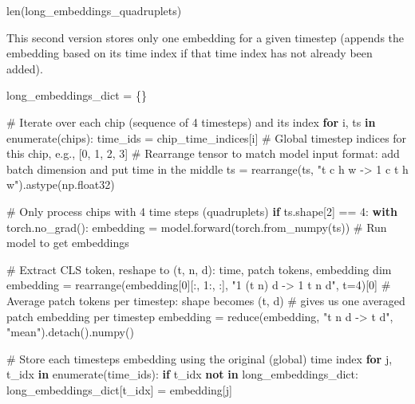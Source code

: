\documentclass[
  letterpaper,
  DIV=11,
  numbers=noendperiod]{scrreprt}
\newenvironment{Shaded}{\begin{snugshade}}{\end{snugshade}}
\newcommand{\BuiltInTok}[1]{\textcolor[rgb]{0.00,0.23,0.31}{#1}}
\newcommand{\CommentTok}[1]{\textcolor[rgb]{0.37,0.37,0.37}{#1}}
\newcommand{\ControlFlowTok}[1]{\textcolor[rgb]{0.00,0.23,0.31}{\textbf{#1}}}
\newcommand{\DecValTok}[1]{\textcolor[rgb]{0.68,0.00,0.00}{#1}}
\newcommand{\KeywordTok}[1]{\textcolor[rgb]{0.00,0.23,0.31}{\textbf{#1}}}
\newcommand{\NormalTok}[1]{\textcolor[rgb]{0.00,0.23,0.31}{#1}}
\newcommand{\OperatorTok}[1]{\textcolor[rgb]{0.37,0.37,0.37}{#1}}
\newcommand{\StringTok}[1]{\textcolor[rgb]{0.13,0.47,0.30}{#1}}
\begin{document}
\begin{Shaded}
\begin{Highlighting}[]
\BuiltInTok{len}\NormalTok{(long\_embeddings\_quadruplets)}
\end{Highlighting}
\end{Shaded}

This second version stores only one embedding for a given timestep
(appends the embedding based on its time index if that time index has
not already been added).

\begin{Shaded}
\begin{Highlighting}[]
\NormalTok{long\_embeddings\_dict }\OperatorTok{=}\NormalTok{ \{\}}

\CommentTok{\# Iterate over each chip (sequence of 4 timesteps) and its index}
\ControlFlowTok{for}\NormalTok{ i, ts }\KeywordTok{in} \BuiltInTok{enumerate}\NormalTok{(chips):}
\NormalTok{    time\_ids }\OperatorTok{=}\NormalTok{ chip\_time\_indices[i]  }\CommentTok{\# Global timestep indices for this chip, e.g., [0, 1, 2, 3]}
    \CommentTok{\# Rearrange tensor to match model input format: add batch dimension and put time in the middle}
\NormalTok{    ts }\OperatorTok{=}\NormalTok{ rearrange(ts, }\StringTok{"t c h w {-}\textgreater{} 1 c t h w"}\NormalTok{).astype(np.float32)}

    \CommentTok{\# Only process chips with 4 time steps (quadruplets)}
    \ControlFlowTok{if}\NormalTok{ ts.shape[}\DecValTok{2}\NormalTok{] }\OperatorTok{==} \DecValTok{4}\NormalTok{:}
        \ControlFlowTok{with}\NormalTok{ torch.no\_grad():}
\NormalTok{            embedding }\OperatorTok{=}\NormalTok{ model.forward(torch.from\_numpy(ts)) }\CommentTok{\# Run model to get embeddings}

        \CommentTok{\# Extract CLS token, reshape to (t, n, d): time, patch tokens, embedding dim}
\NormalTok{        embedding }\OperatorTok{=}\NormalTok{ rearrange(embedding[}\DecValTok{0}\NormalTok{][:, }\DecValTok{1}\NormalTok{:, :], }\StringTok{"1 (t n) d {-}\textgreater{} 1 t n d"}\NormalTok{, t}\OperatorTok{=}\DecValTok{4}\NormalTok{)[}\DecValTok{0}\NormalTok{]}
        \CommentTok{\# Average patch tokens per timestep: shape becomes (t, d)}
        \CommentTok{\# gives us one averaged patch embedding per timestep}
\NormalTok{        embedding }\OperatorTok{=} \BuiltInTok{reduce}\NormalTok{(embedding, }\StringTok{"t n d {-}\textgreater{} t d"}\NormalTok{, }\StringTok{"mean"}\NormalTok{).detach().numpy()}

        \CommentTok{\# Store each timestep\textquotesingle{}s embedding using the original (global) time index}
        \ControlFlowTok{for}\NormalTok{ j, t\_idx }\KeywordTok{in} \BuiltInTok{enumerate}\NormalTok{(time\_ids):}
            \ControlFlowTok{if}\NormalTok{ t\_idx }\KeywordTok{not} \KeywordTok{in}\NormalTok{ long\_embeddings\_dict:}
\NormalTok{                long\_embeddings\_dict[t\_idx] }\OperatorTok{=}\NormalTok{ embedding[j]}


\end{Highlighting}
\end{Shaded}
\end{document}
